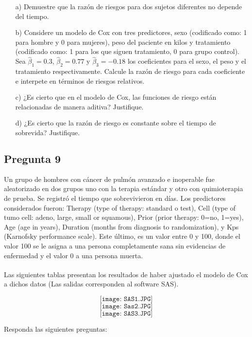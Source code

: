 \documentclass[10pt]{article}\usepackage[]{graphicx}\usepackage[]{color}
\begin{document}
\begin{itemize}

\item[a)] Demuestre que la razón de riesgos para dos sujetos diferentes no depende del tiempo.
\item[b)] Considere un modelo de Cox con tres predictores, sexo (codificado como: 1 para hombre y 0 para mujeres), peso del paciente en kilos y tratamiento (codificado como: 1 para los que siguen tratamiento, 0 para grupo control). Sea $\hat{\beta}_{1}=0.3$, $\hat{\beta}_{2}=0.77$ y $\hat{\beta}_{3}=-0.18$ los coeficientes para el sexo, el peso y el tratamiento respectivamente. Calcule la razón de riesgo para cada coeficiente e interpete en términos de riesgos relativos.
\item[c)] ¿Es cierto que en el modelo de Cox, las funciones de riesgo están relacionadas de manera aditiva? Justifique.
\item[d)] ¿Es cierto que la razón de riesgo es constante sobre el tiempo de sobrevida? Justifique.

\end{itemize}

\subsection*{Pregunta 9}
Un grupo de hombres con cáncer de pulmón avanzado e inoperable fue aleatorizado en dos grupos uno con la terapia estándar y otro con quimioterapia de prueba. Se registró el tiempo que sobrevivieron en días. Los predictores considerados fueron: Therapy (type of therapy: standard o test), Cell (type of tumo cell: adeno, large, small or squamous), Prior (prior therapy: 0=no, 1=yes), Age (age in years), Duration (months from diagnosis to randomization), y Kps (Karnofsky performance scale). Este último, es un valor entre 0 y 100, donde el valor 100 se le asigna a una persona completamente sana sin evidencias de enfermedad y el valor 0 a una persona muerta.\\
\\
Las siguientes tablas presentan los resultados de haber ajustado el modelo de Cox a dichos datos (Las salidas corresponden al software SAS).

$$\texttt{[image: SAS1.JPG]}$$
$$\texttt{[image: Sas2.JPG]}$$
$$\texttt{[image: SAS3.JPG]}$$
 

Responda las siguientes preguntas:
\end{document}
